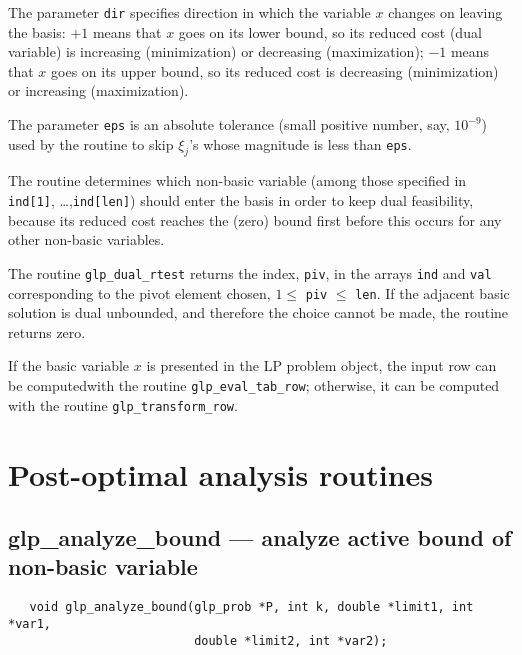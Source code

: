The parameter \verb|dir| specifies direction in which the variable $x$
changes on leaving the basis: $+1$ means that $x$ goes on its lower
bound, so its reduced cost (dual variable) is increasing (minimization)
or decreasing (maximization); $-1$ means that $x$ goes on its upper
bound, so its reduced cost is decreasing (minimization) or increasing
(maximization).

The parameter \verb|eps| is an absolute tolerance (small positive
number, say, $10^{-9}$) used by the routine to skip $\xi_j$'s whose
magnitude is less than \verb|eps|.

The routine determines which non-basic variable (among those specified
in \verb|ind[1]|, \dots,\linebreak \verb|ind[len]|) should enter the
basis in order to keep dual feasibility, because its reduced cost
reaches the (zero) bound first before this occurs for any other
non-basic variables.

\returns

The routine \verb|glp_dual_rtest| returns the index, \verb|piv|, in the
arrays \verb|ind| and \verb|val| corresponding to the pivot element
chosen, $1\leq$ \verb|piv| $\leq$ \verb|len|. If the adjacent basic
solution is dual unbounded, and therefore the choice cannot be made,
the routine returns zero.


If the basic variable $x$ is presented in the LP problem object, the
input row can be computed\linebreak with the routine
\verb|glp_eval_tab_row|; otherwise, it can be computed with the routine
\linebreak \verb|glp_transform_row|.


\newpage

\section{Post-optimal analysis routines}

\subsection{glp\_analyze\_bound --- analyze active bound of non-basic
variable}

\synopsis

\begin{verbatim}
   void glp_analyze_bound(glp_prob *P, int k, double *limit1, int *var1,
                          double *limit2, int *var2);
\end{verbatim}

